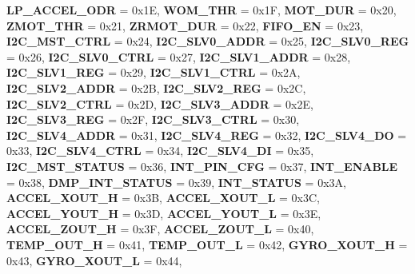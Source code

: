 \begin{DoxyCompactItemize}
{\bfseries L\+P\+\_\+\+A\+C\+C\+E\+L\+\_\+\+O\+DR} = 0x1E, 
{\bfseries W\+O\+M\+\_\+\+T\+HR} = 0x1F, 
{\bfseries M\+O\+T\+\_\+\+D\+UR} = 0x20, 
\newline
{\bfseries Z\+M\+O\+T\+\_\+\+T\+HR} = 0x21, 
{\bfseries Z\+R\+M\+O\+T\+\_\+\+D\+UR} = 0x22, 
{\bfseries F\+I\+F\+O\+\_\+\+EN} = 0x23, 
{\bfseries I2\+C\+\_\+\+M\+S\+T\+\_\+\+C\+T\+RL} = 0x24, 
\newline
{\bfseries I2\+C\+\_\+\+S\+L\+V0\+\_\+\+A\+D\+DR} = 0x25, 
{\bfseries I2\+C\+\_\+\+S\+L\+V0\+\_\+\+R\+EG} = 0x26, 
{\bfseries I2\+C\+\_\+\+S\+L\+V0\+\_\+\+C\+T\+RL} = 0x27, 
{\bfseries I2\+C\+\_\+\+S\+L\+V1\+\_\+\+A\+D\+DR} = 0x28, 
\newline
{\bfseries I2\+C\+\_\+\+S\+L\+V1\+\_\+\+R\+EG} = 0x29, 
{\bfseries I2\+C\+\_\+\+S\+L\+V1\+\_\+\+C\+T\+RL} = 0x2A, 
{\bfseries I2\+C\+\_\+\+S\+L\+V2\+\_\+\+A\+D\+DR} = 0x2B, 
{\bfseries I2\+C\+\_\+\+S\+L\+V2\+\_\+\+R\+EG} = 0x2C, 
\newline
{\bfseries I2\+C\+\_\+\+S\+L\+V2\+\_\+\+C\+T\+RL} = 0x2D, 
{\bfseries I2\+C\+\_\+\+S\+L\+V3\+\_\+\+A\+D\+DR} = 0x2E, 
{\bfseries I2\+C\+\_\+\+S\+L\+V3\+\_\+\+R\+EG} = 0x2F, 
{\bfseries I2\+C\+\_\+\+S\+L\+V3\+\_\+\+C\+T\+RL} = 0x30, 
\newline
{\bfseries I2\+C\+\_\+\+S\+L\+V4\+\_\+\+A\+D\+DR} = 0x31, 
{\bfseries I2\+C\+\_\+\+S\+L\+V4\+\_\+\+R\+EG} = 0x32, 
{\bfseries I2\+C\+\_\+\+S\+L\+V4\+\_\+\+DO} = 0x33, 
{\bfseries I2\+C\+\_\+\+S\+L\+V4\+\_\+\+C\+T\+RL} = 0x34, 
\newline
{\bfseries I2\+C\+\_\+\+S\+L\+V4\+\_\+\+DI} = 0x35, 
{\bfseries I2\+C\+\_\+\+M\+S\+T\+\_\+\+S\+T\+A\+T\+US} = 0x36, 
{\bfseries I\+N\+T\+\_\+\+P\+I\+N\+\_\+\+C\+FG} = 0x37, 
{\bfseries I\+N\+T\+\_\+\+E\+N\+A\+B\+LE} = 0x38, 
\newline
{\bfseries D\+M\+P\+\_\+\+I\+N\+T\+\_\+\+S\+T\+A\+T\+US} = 0x39, 
{\bfseries I\+N\+T\+\_\+\+S\+T\+A\+T\+US} = 0x3A, 
{\bfseries A\+C\+C\+E\+L\+\_\+\+X\+O\+U\+T\+\_\+H} = 0x3B, 
{\bfseries A\+C\+C\+E\+L\+\_\+\+X\+O\+U\+T\+\_\+L} = 0x3C, 
\newline
{\bfseries A\+C\+C\+E\+L\+\_\+\+Y\+O\+U\+T\+\_\+H} = 0x3D, 
{\bfseries A\+C\+C\+E\+L\+\_\+\+Y\+O\+U\+T\+\_\+L} = 0x3E, 
{\bfseries A\+C\+C\+E\+L\+\_\+\+Z\+O\+U\+T\+\_\+H} = 0x3F, 
{\bfseries A\+C\+C\+E\+L\+\_\+\+Z\+O\+U\+T\+\_\+L} = 0x40, 
\newline
{\bfseries T\+E\+M\+P\+\_\+\+O\+U\+T\+\_\+H} = 0x41, 
{\bfseries T\+E\+M\+P\+\_\+\+O\+U\+T\+\_\+L} = 0x42, 
{\bfseries G\+Y\+R\+O\+\_\+\+X\+O\+U\+T\+\_\+H} = 0x43, 
{\bfseries G\+Y\+R\+O\+\_\+\+X\+O\+U\+T\+\_\+L} = 0x44, 

\end{DoxyCompactItemize}
